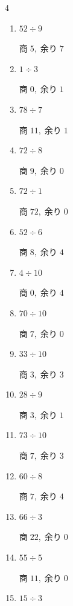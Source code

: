 \begin{multicols}{4}
\begin{enumerate}
        $商\; 4,\; 余り\; 1$

  \item $52 \div 9$

        $商\; 5,\; 余り\; 7$

  \item $1 \div 3$

        $商\; 0,\; 余り\; 1$

  \item $78 \div 7$

        $商\; 11,\; 余り\; 1$

  \item $72 \div 8$

        $商\; 9,\; 余り\; 0$

  \item $72 \div 1$

        $商\; 72,\; 余り\; 0$

  \item $52 \div 6$

        $商\; 8,\; 余り\; 4$

  \item $4 \div 10$

        $商\; 0,\; 余り\; 4$

  \item $70 \div 10$

        $商\; 7,\; 余り\; 0$

  \item $33 \div 10$

        $商\; 3,\; 余り\; 3$

  \item $28 \div 9$

        $商\; 3,\; 余り\; 1$

  \item $73 \div 10$

        $商\; 7,\; 余り\; 3$

  \item $60 \div 8$

        $商\; 7,\; 余り\; 4$

\columnbreak %

  \item $66 \div 3$

        $商\; 22,\; 余り\; 0$

  \item $55 \div 5$

        $商\; 11,\; 余り\; 0$

  \item $15 \div 3$


\end{enumerate}
\end{multicols}
